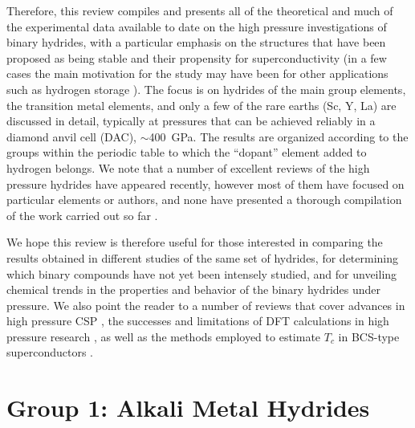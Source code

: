 \documentclass[12pt,letterpaper,oneside]{article}
\begin{document}
Therefore, this review compiles and presents all of the theoretical and much of the experimental data available to date on the high pressure investigations of binary hydrides, with a particular emphasis on the structures that have been proposed as being stable and their propensity for superconductivity (in a few cases the main motivation for the study may have been for other applications such as hydrogen storage \cite{Song:2013a}). The focus is on hydrides of the main group elements, the transition metal elements, and only a few of the rare earths (Sc, Y, La) are discussed in detail, typically at pressures that can be achieved reliably in a diamond anvil cell (DAC), $\sim$400~GPa. The results are organized according to the groups within the periodic table to which the ``dopant'' element added to hydrogen belongs. We note that a number of excellent reviews of the high pressure hydrides have appeared recently, however most of them have focused on particular elements or authors, and none have presented a thorough compilation of the work carried out so far \cite{Zurek:2016d,Shamp:2016,Zhang:2017,Duan:2017a,Wang:2017a,Struzhkin:2015a,random3,Yao-S-review:2018}. 

We hope this review is therefore useful for those interested in comparing the results obtained in different studies of the same set of hydrides, for determining which binary compounds have not yet been intensely studied, and for unveiling chemical trends in the properties and behavior of the binary hydrides under pressure. We also point the reader to a number of reviews that cover advances in high pressure CSP \cite{Zhang:2017,Wang:2014a,random1,random3}, the successes and limitations of DFT calculations in high pressure research \cite{Zurek:2014i}, as well as the methods employed to estimate $T_c$ in BCS-type superconductors \cite{bose2009electron}.





\section{Group 1: Alkali Metal Hydrides}
%
\end{document}
